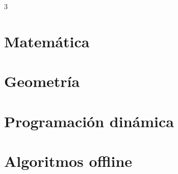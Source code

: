 \documentclass[10pt,landscape,oneside,openany,a4paper,notitlepage]{book}
\begin{document}
\begin{multicols*}{3}
\chapter{Matem\'atica}












\chapter{Geometr\'ia}





\chapter{Programaci\'on din\'amica}








\chapter{Algoritmos offline}


\end{multicols*}
\end{document}
